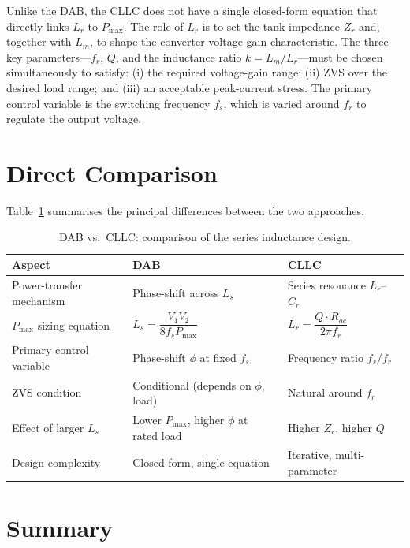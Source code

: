 \documentclass[a4paper, 11pt]{article}
\begin{document}
Unlike the DAB, the CLLC does not have a single closed-form equation
that directly links $L_r$ to $P_{\max}$.  The role of $L_r$ is to set
the tank impedance $Z_r$ and, together with $L_m$, to shape the
converter voltage gain characteristic.  The three key parameters—$f_r$,
$Q$, and the inductance ratio $k = L_m / L_r$—must be chosen
simultaneously to satisfy: (i) the required voltage-gain range;
(ii) ZVS over the desired load range; and (iii) an acceptable
peak-current stress.  The primary control variable is the switching
frequency $f_s$, which is varied around $f_r$ to regulate the output
voltage.

\section{Direct Comparison}

Table~\ref{tab:comparison} summarises the principal differences between
the two approaches.

\begin{table}[ht]
  \centering
  \caption{DAB vs.\ CLLC: comparison of the series inductance design.}
  \label{tab:comparison}
  \renewcommand{\arraystretch}{1.4}
  \begin{tabular}{lll}
    \toprule
    \textbf{Aspect} & \textbf{DAB} & \textbf{CLLC} \\
    \midrule
    Power-transfer mechanism
      & Phase-shift across $L_s$
      & Series resonance $L_r$–$C_r$ \\
    $P_{\max}$ sizing equation
      & $L_s = \dfrac{V_1 V_2}{8 f_s P_{\max}}$
      & $L_r = \dfrac{Q \cdot R_{ac}}{2\pi f_r}$ \\
    Primary control variable
      & Phase-shift $\phi$ at fixed $f_s$
      & Frequency ratio $f_s / f_r$ \\
    ZVS condition
      & Conditional (depends on $\phi$, load)
      & Natural around $f_r$ \\
    Effect of larger $L_s$
      & Lower $P_{\max}$, higher $\phi$ at rated load
      & Higher $Z_r$, higher $Q$ \\
    Design complexity
      & Closed-form, single equation
      & Iterative, multi-parameter \\
    \bottomrule
  \end{tabular}
\end{table}

\section{Summary}
\end{document}
